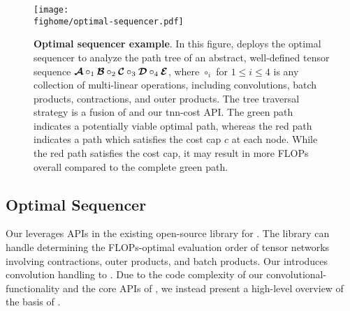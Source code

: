 

\begin{figure*}[!ht]
\begin{centering}
 \texttt{[image: \\fighome/optimal-sequencer.pdf]}
 \vspace{-0.5em}
 \caption{\textbf{Optimal sequencer example}. In this figure, \conveinsum deploys the optimal sequencer to analyze the path tree of an abstract, well-defined tensor sequence $\bm{\mathcal{A}} \circ_1 \bm{\mathcal{B}} \circ_2 \bm{\mathcal{C}} \circ_3 \bm{\mathcal{D}} \circ_4 \bm{\mathcal{E}}$, where $\circ_i$ for $1\leq i \leq 4$ is any collection of multi-linear operations, including convolutions, batch products, contractions, and outer products. The tree traversal strategy is a fusion of \netcon and our \textsf{tnn-cost} API. The green path indicates a potentially viable optimal path, whereas the red path indicates a path which satisfies the cost cap $c$ at each node. While the red path satisfies the cost cap, it may result in more FLOPs overall compared to the complete green path.
 \vspace{-1em}}
 \label{fig:opt-seq}
\end{centering}
\end{figure*}

\subsection{Optimal Sequencer}
\label{sub:algorithms-sequencer}

Our \conveinsum leverages APIs in the existing open-source \opteinsum library for \numpy \citep{daniel2018opt}. The \opteinsum library can handle determining the FLOPs-optimal evaluation order of tensor networks involving contractions, outer products, and batch products. 
Our \conveinsum introduces convolution handling to \opteinsum. Due to the code complexity of our convolutional-functionality and the core APIs of \opteinsum, we instead present a high-level overview of the basis of \conveinsum. 

